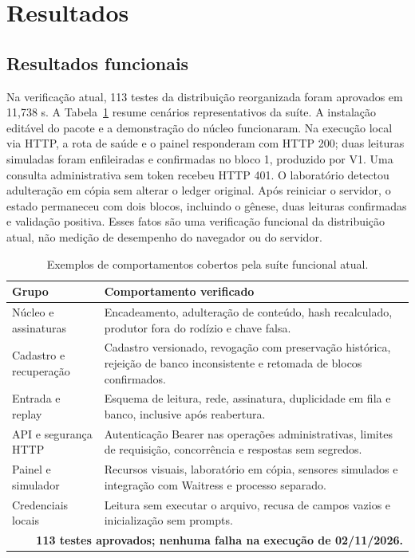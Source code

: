 \documentclass[10pt,a4paper,twocolumn]{article}
\begin{document}
\section{Resultados}
\subsection{Resultados funcionais}
Na verificação atual, 113 testes da distribuição reorganizada foram aprovados em 11,738 s. A Tabela~\ref{tab:testes} resume cenários representativos da suíte. A instalação editável do pacote e a demonstração do núcleo funcionaram. Na execução local via HTTP, a rota de saúde e o painel responderam com HTTP 200; duas leituras simuladas foram enfileiradas e confirmadas no bloco 1, produzido por V1. Uma consulta administrativa sem token recebeu HTTP 401. O laboratório detectou adulteração em cópia sem alterar o ledger original. Após reiniciar o servidor, o estado permaneceu com dois blocos, incluindo o gênese, duas leituras confirmadas e validação positiva. Esses fatos são uma verificação funcional da distribuição atual, não medição de desempenho do navegador ou do servidor.

\begin{table}[t]
\centering\small
\caption{Exemplos de comportamentos cobertos pela suíte funcional atual.}
\label{tab:testes}
\begin{tabularx}{\textwidth}{p{}X}
\toprule
Grupo & Comportamento verificado \\
\midrule
Núcleo e assinaturas & Encadeamento, adulteração de conteúdo, hash recalculado, produtor fora do rodízio e chave falsa. \\
Cadastro e recuperação & Cadastro versionado, revogação com preservação histórica, rejeição de banco inconsistente e retomada de blocos confirmados. \\
Entrada e replay & Esquema de leitura, rede, assinatura, duplicidade em fila e banco, inclusive após reabertura. \\
API e segurança HTTP & Autenticação Bearer nas operações administrativas, limites de requisição, concorrência e respostas sem segredos. \\
Painel e simulador & Recursos visuais, laboratório em cópia, sensores simulados e integração com Waitress e processo separado. \\
Credenciais locais & Leitura sem executar o arquivo, recusa de campos vazios e inicialização sem prompts. \\
\midrule
\multicolumn{2}{r}{\textbf{113 testes aprovados; nenhuma falha na execução de 02/11/2026.}} \\
\bottomrule
\end{tabularx}
\end{table}
\end{document}
